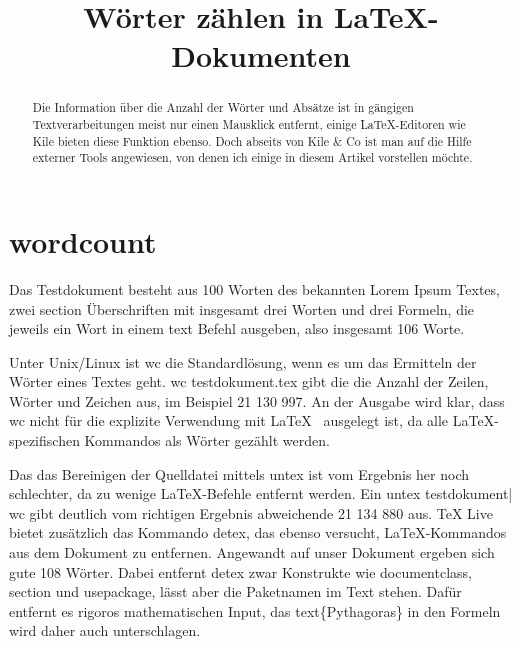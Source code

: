 \documentclass[ngerman]{dtk}
\title{Wörter zählen in \LaTeX-Dokumenten}
\begin{document}
\maketitle

\newcommand{\bs}{\symbol{`\\}}
\newcommand{\hint}[1]{#1}
\newcommand{\hintb}[1]{#1}







\begin{abstract}
Die Information über die Anzahl der Wörter und Absätze ist in gängigen Textverarbeitungen meist nur einen Mausklick entfernt, einige \LaTeX-Editoren wie Kile bieten diese Funktion ebenso. Doch abseits von Kile \& Co ist man auf die Hilfe externer Tools angewiesen, von denen ich einige in diesem Artikel vorstellen möchte.
\end{abstract}

\section{wordcount}

Das Testdokument besteht aus 100 Worten des bekannten \hint{Lorem Ipsum} Textes, zwei \hint{section} Überschriften mit insgesamt drei Worten und drei Formeln, die jeweils ein Wort in einem \hintb{text} Befehl ausgeben, also insgesamt 106 Worte. 

Unter Unix/Linux ist \hint{wc} die Standardlösung, wenn es um das Ermitteln der Wörter eines Textes geht. \hint{wc testdokument.tex} gibt die die Anzahl der Zeilen, Wörter und Zeichen aus, im Beispiel \hint{21 130 997}. An der Ausgabe wird klar, dass \hint{wc} nicht für die explizite Verwendung mit \LaTeX~ ausgelegt ist, da alle \LaTeX-spezifischen Kommandos als Wörter gezählt werden. 

Das das Bereinigen der Quelldatei mittels \hint{untex} ist vom Ergebnis her noch schlechter, da zu wenige \LaTeX-Befehle entfernt werden. Ein \hint{untex testdokument| wc} gibt deutlich vom richtigen Ergebnis abweichende \hint{21 134 880} aus.  TeX Live bietet zusätzlich das Kommando \hint{detex}, das ebenso versucht, \LaTeX-Kommandos aus dem Dokument zu entfernen. Angewandt auf unser Dokument ergeben sich gute 108 Wörter. Dabei entfernt \hint{detex} zwar Konstrukte wie \hintb{documentclass}, \hintb{section} und \hintb{usepackage}, lässt aber die Paketnamen im Text stehen. Dafür entfernt es rigoros mathematischen Input, das \hintb{text\{Pythagoras\}} in den Formeln wird daher auch unterschlagen. 
\end{document}
